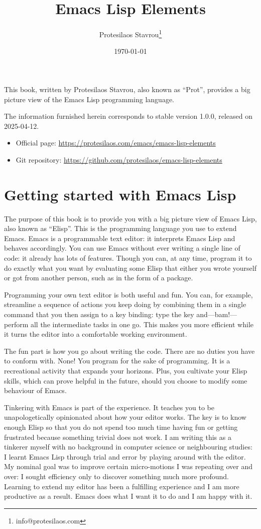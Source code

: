 \documentclass[11pt]{ctexart}
\author{Protesilaos Stavrou\thanks{info@protesilaos.com}}
\date{\today}
\title{Emacs Lisp Elements}
\begin{document}
\maketitle
This book, written by Protesilaos Stavrou, also known as ``Prot'', provides a big picture view of the Emacs Lisp programming language.

The information furnished herein corresponds to stable version 1.0.0, released on 2025-04-12.

\begin{itemize}
\item Official page: \url{https://protesilaos.com/emacs/emacs-lisp-elements}
\item Git repository: \url{https://github.com/protesilaos/emacs-lisp-elements}
\end{itemize}

\setcounter{tocdepth}{8}
\tableofcontents
\section{Getting started with Emacs Lisp}
\label{sec:orga5d8310}
The purpose of this book is to provide you with a big picture view of Emacs Lisp, also known as ``Elisp''. This is the programming language you use to extend Emacs. Emacs is a programmable text editor: it interprets Emacs Lisp and behaves accordingly. You can use Emacs without ever writing a single line of code: it already has lots of features. Though you can, at any time, program it to do exactly what you want by evaluating some Elisp that either you wrote yourself or got from another person, such as in the form of a package.

Programming your own text editor is both useful and fun. You can, for example, streamline a sequence of actions you keep doing by combining them in a single command that you then assign to a key binding: type the key and---bam!---perform all the intermediate tasks in one go. This makes you more efficient while it turns the editor into a comfortable working environment.

The fun part is how you go about writing the code. There are no duties you have to conform with. None! You program for the sake of programming. It is a recreational activity that expands your horizons. Plus, you cultivate your Elisp skills, which can prove helpful in the future, should you choose to modify some behaviour of Emacs.

Tinkering with Emacs is part of the experience. It teaches you to be unapologetically opinionated about how your editor works. The key is to know enough Elisp so that you do not spend too much time having fun or getting frustrated because something trivial does not work. I am writing this as a tinkerer myself with no background in computer science or neighbouring studies: I learnt Emacs Lisp through trial and error by playing around with the editor. My nominal goal was to improve certain micro-motions I was repeating over and over: I sought efficiency only to discover something much more profound. Learning to extend my editor has been a fulfilling experience and I am more productive as a result. Emacs does what I want it to do and I am happy with it.
\end{document}
